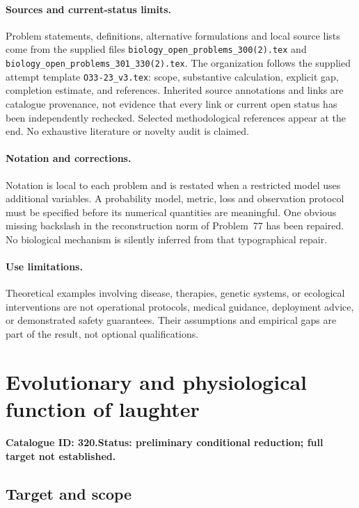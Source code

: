 \documentclass[11pt]{article}
\begin{document}
\paragraph{Sources and current-status limits.}
Problem statements, definitions, alternative formulations and local source lists
come from the supplied files
\texttt{biology\_open\_problems\_300(2).tex} and
\texttt{biology\_open\_problems\_301\_330(2).tex}.
The organization follows the supplied attempt template
\texttt{O33-23\_v3.tex}: scope, substantive calculation, explicit gap,
completion estimate, and references. Inherited source annotations and links are
catalogue provenance, not evidence that every link or current open status has
been independently rechecked. Selected methodological references appear at the
end. No exhaustive literature or novelty audit is claimed.

\paragraph{Notation and corrections.}
Notation is local to each problem and is restated when a restricted model uses
additional variables. A probability model, metric, loss and observation protocol
must be specified before its numerical quantities are meaningful. One obvious
missing backslash in the reconstruction norm of Problem~77 has been repaired.
No biological mechanism is silently inferred from that typographical repair.

\paragraph{Use limitations.}
Theoretical examples involving disease, therapies, genetic systems, or ecological
interventions are not operational protocols, medical guidance, deployment advice,
or demonstrated safety guarantees. Their assumptions and empirical gaps are part
of the result, not optional qualifications.

\setcounter{section}{319}
\section{Evolutionary and physiological function of laughter}
\label{prob:320}
\noindent\textbf{Catalogue ID: 320.}\quad \textbf{Status: preliminary conditional reduction; full target not established.}
\subsection{Target and scope}
\end{document}
